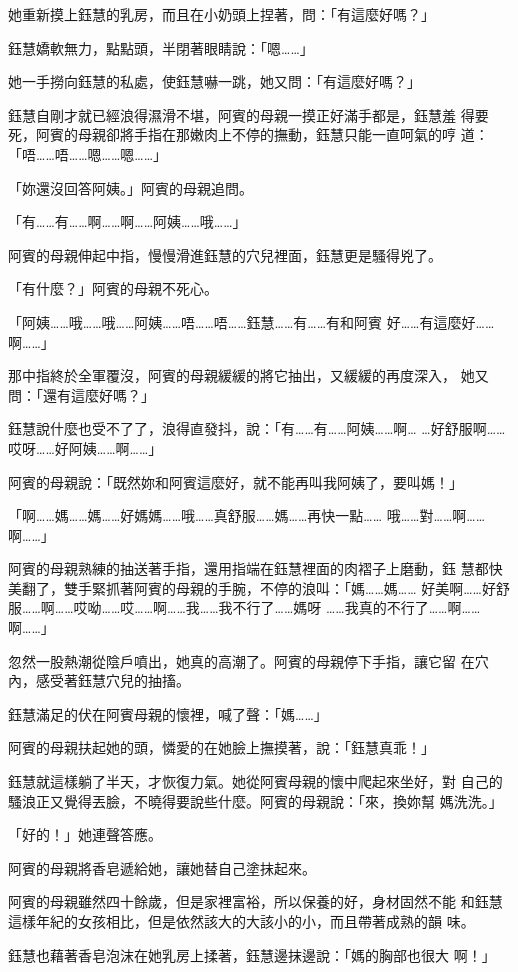 她重新摸上鈺慧的乳房，而且在小奶頭上捏著，問：「有這麼好嗎？」

鈺慧嬌軟無力，點點頭，半閉著眼睛說：「嗯……」

她一手撈向鈺慧的私處，使鈺慧嚇一跳，她又問：「有這麼好嗎？」

鈺慧自剛才就已經浪得濕滑不堪，阿賓的母親一摸正好滿手都是，鈺慧羞
得要死，阿賓的母親卻將手指在那嫩肉上不停的撫動，鈺慧只能一直呵氣的哼
道：「唔……唔……嗯……嗯……」

「妳還沒回答阿姨。」阿賓的母親追問。

「有……有……啊……啊……阿姨……哦……」

阿賓的母親伸起中指，慢慢滑進鈺慧的穴兒裡面，鈺慧更是騷得兇了。

「有什麼？」阿賓的母親不死心。

「阿姨……哦……哦……阿姨……唔……唔……鈺慧……有……有和阿賓
好……有這麼好……啊……」

那中指終於全軍覆沒，阿賓的母親緩緩的將它抽出，又緩緩的再度深入，
她又問：「還有這麼好嗎？」

鈺慧說什麼也受不了了，浪得直發抖，說：「有……有……阿姨……啊…
…好舒服啊……哎呀……好阿姨……啊……」

阿賓的母親說：「既然妳和阿賓這麼好，就不能再叫我阿姨了，要叫媽！」

「啊……媽……媽……好媽媽……哦……真舒服……媽……再快一點……
哦……對……啊……啊……」

阿賓的母親熟練的抽送著手指，還用指端在鈺慧裡面的肉褶子上磨動，鈺
慧都快美翻了，雙手緊抓著阿賓的母親的手腕，不停的浪叫：「媽……媽……
好美啊……好舒服……啊……哎呦……哎……啊……我……我不行了……媽呀
……我真的不行了……啊……啊……」

忽然一股熱潮從陰戶噴出，她真的高潮了。阿賓的母親停下手指，讓它留
在穴內，感受著鈺慧穴兒的抽搐。

鈺慧滿足的伏在阿賓母親的懷裡，喊了聲：「媽……」

阿賓的母親扶起她的頭，憐愛的在她臉上撫摸著，說：「鈺慧真乖！」

鈺慧就這樣躺了半天，才恢復力氣。她從阿賓母親的懷中爬起來坐好，對
自己的騷浪正又覺得丟臉，不曉得要說些什麼。阿賓的母親說：「來，換妳幫
媽洗洗。」

「好的！」她連聲答應。

阿賓的母親將香皂遞給她，讓她替自己塗抹起來。

阿賓的母親雖然四十餘歲，但是家裡富裕，所以保養的好，身材固然不能
和鈺慧這樣年紀的女孩相比，但是依然該大的大該小的小，而且帶著成熟的韻
味。

鈺慧也藉著香皂泡沫在她乳房上揉著，鈺慧邊抹邊說：「媽的胸部也很大
啊！」

